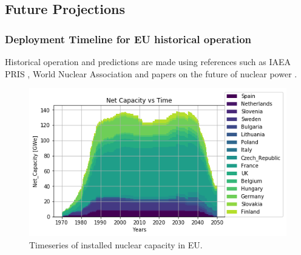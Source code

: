 \subsection{Future Projections}





\begin{frame}
	\frametitle{Deployment Timeline for EU historical operation}
	Historical operation and predictions are made using references such as \gls{IAEA} \gls{PRIS} \cite{iaea_pris_2017},
	World Nuclear Association \cite{world_nuclear_association_nuclear_2017} and papers on the 
	future of nuclear power
	\cite{joskow_future_2012, hatch_politics_2015}.
	\begin{figure}[htbp!]
		\begin{center}
			\includegraphics[width=.8\linewidth,height=.8\textheight,keepaspectratio]{./images/eu_future/power_plot.png}
		\end{center}
		\caption{Timeseries of installed nuclear capacity in \gls{EU}.}
		\label{fig:eu_pow}
	\end{figure}
	
\end{frame}


